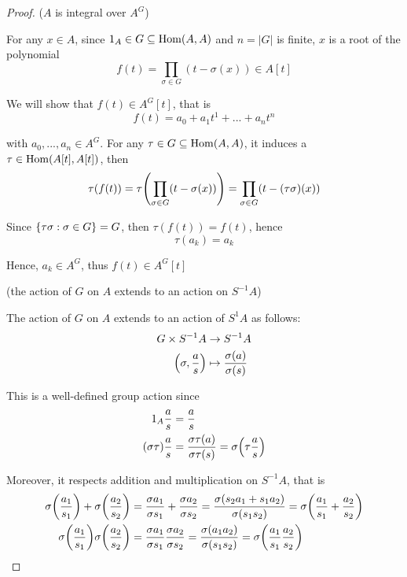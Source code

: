 \begin{proof}
	($A$ is integral over $A^G$)
	
	For any $x \in A$, since $1_A \in G \subseteq \Hom(A, A)$ and $n = |G|$ is finite, $x$ is a root of the polynomial 
	$$
		f(t) = \prod_{\sigma \in G} (t - \sigma(x)) \in A[t]
	$$
	
	We will show that $f(t) \in A^G[t]$, that is
	$$
		f(t) = a_0 + a_1 t^1 + ... + a_n t^n
	$$
	
	with $a_0, ..., a_n \in A^G$. For any $\tau \in G \subseteq \Hom(A, A)$, it induces a $\tau \in \Hom(A[t], A[t])$, then
	$$
		\tau(f(t)) = \tau\tuple*{\prod_{\sigma \in G} (t - \sigma(x))} = \prod_{\sigma \in G} (t - (\tau \sigma)(x))
	$$
	
	Since $\set{\tau \sigma: \sigma \in G} = G$, then $\tau(f(t)) = f(t)$, hence
	$$
		\tau(a_k) = a_k
	$$
	
	Hence, $a_k \in A^G$, thus $f(t) \in A^G[t]$
	
	(the action of $G$ on $A$ extends to an action on $S^{-1} A$)
	
	The action of $G$ on $A$ extends to an action of $S^{1} A$ as follows:
	\begin{align*}
		G \times S^{-1} A &\to S^{-1} A \\
		\tuple*{\sigma, \frac{a}{s}} &\mapsto \frac{\sigma(a)}{\sigma(s)}
	\end{align*}
	
	This is a well-defined group action since
	\begin{align*}
		1_A \frac{a}{s} &= \frac{a}{s} \\
		(\sigma \tau) \frac{a}{s} &= \frac{\sigma \tau(a)}{\sigma \tau(s)} = \sigma \tuple*{\tau \frac{a}{s}}\\
	\end{align*}
	
	Moreover, it respects addition and multiplication on $S^{-1} A$, that is
	\begin{align*}
		\sigma\tuple*{\frac{a_1}{s_1}} + \sigma\tuple*{\frac{a_2}{s_2}} &= \frac{\sigma a_1}{\sigma s_1} + \frac{\sigma a_2}{\sigma s_2} = \frac{\sigma(s_2 a_1 + s_1 a_2)}{\sigma(s_1 s_2)} = \sigma \tuple*{\frac{a_1}{s_1} + \frac{a_2}{s_2}} \\
		\sigma\tuple*{\frac{a_1}{s_1}} \sigma\tuple*{\frac{a_2}{s_2}} &= \frac{\sigma a_1}{\sigma s_1} \frac{\sigma a_2}{\sigma s_2} = \frac{\sigma(a_1 a_2)}{\sigma(s_1 s_2)} = \sigma\tuple*{\frac{a_1}{s_1} \frac{a_2}{s_2}}
	\end{align*}
	

\end{proof}
